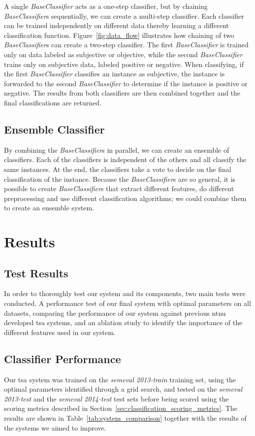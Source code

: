 A single \textit{BaseClassifier} acts as a one-step classifier, but by chaining \textit{BaseClassifier}s sequentially, we can create a multi-step classifier. Each classifier can be trained independently on different data thereby learning a different classification function. Figure~\ref{fig:data_flow} illustrates how chaining of two \textit{BaseClassifier}s can create a two-step classifier. The first \textit{BaseClassifier} is trained only on data labeled as subjective or objective, while the second \textit{BaseClassifier} trains only on subjective data, labeled positive or negative. When classifying, if the first \textit{BaseClassifier} classifies an instance as subjective, the instance is forwarded to the second \textit{BaseClassifier} to determine if the instance is positive or negative. The results from both classifiers are then combined together and the final classifications are returned.

\subsection{Ensemble Classifier}
By combining the \textit{BaseClassifier}s in parallel, we can create an ensemble of classifiers. Each of the classifiers is independent of the others and all classify the same instances. At the end, the classifiers take a vote to decide on the final classification of the instance. Because the \textit{BaseClassifier}s are so general, it is possible to create \textit{BaseClassifier}s that extract different features, do different preprocessing and use different classification algorithms; we could combine them to create an ensemble system. 


\section{Results}
\label{sec:init_experiment_results}

\subsection{Test Results}
\label{sec:test_results}
In order to thoroughly test our system and its components, two main tests were conducted. A performance test of our final system with optimal parameters on all datasets, comparing the performance of our system against previous \ac{ntnu} developed \ac{tsa} systems, and an ablation study to identify the importance of the different features used in our system. 

\subsection*{Classifier Performance}
 Our \ac{tsa} system was trained on the \textit{\ac{semeval} 2013-train} training set, using the optimal parameters identified through a grid search, and tested on the \textit{\ac{semeval} 2013-test} and the \textit{\ac{semeval} 2014-test} test sets before being scored using the scoring metrics described in Section~\ref{sec:classification_scoring_metrics}. The results are shown in Table~\ref{tab:system_comparison} together with the results of the systems we aimed to improve. \\
 
